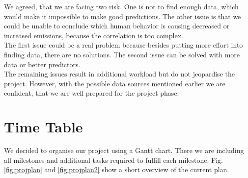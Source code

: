 \documentclass[lang=english,inputenc=utf8,fontsize=10pt]{ldvarticle}
\begin{document}
We agreed, that we are facing two risk. One is not to find enough data, which would make it impossible to make good predictions. The other issue is that we could be unable to conclude which human behavior is causing decreased or increased emissions, because the correlation is too complex.\\
The first issue could be a real problem because besides putting more effort into finding data, there are no solutions. The second issue can be solved with more data or better predictors.\\

The remaining issues result in additional workload but do not jeopardise the project. However, with the possible data sources mentioned earlier we are confident, that we are well prepared for the project phase.\\



\section{Time Table}

We decided to organise our project using a Gantt chart. There we are including all milestones and additional tasks required to fulfill each milestone. Fig. \ref{fig:projplan} and \ref{fig:projplan2} show a short overview of the current plan.\\
\end{document}
